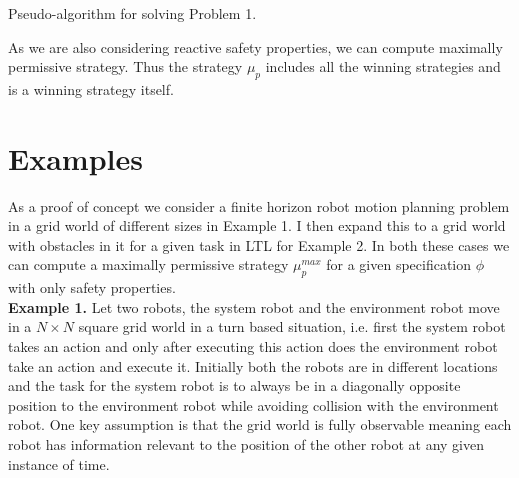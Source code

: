 \documentclass[letterpaper, 10 pt, conference]{ieeeconf}  %
\begin{document}
\begin{algorithm}
    \SetAlgoLined
    
\caption{Pseudo-algorithm for solving Problem 1.}

\end{algorithm}

As we are also considering reactive safety properties, we can compute maximally permissive strategy. Thus the strategy $\mu_p$ includes all the winning strategies and is a winning strategy itself.  

\section{Examples}

As a proof of concept we consider a finite horizon robot motion planning problem in a grid world of different sizes in Example 1. I then expand this to a grid world with obstacles in it for a given task in LTL for Example 2.  In both these cases we can compute a maximally permissive strategy $\mu_p^{max}$ for a given specification $\phi$ with only safety properties.\\

\textbf{Example 1.} Let two robots, the system robot and the environment robot move in a $N \times N$ square grid world in a turn based situation, i.e. first the system robot takes an action and only after executing this action does the environment robot take an action and execute it. Initially both the robots are in different locations and the task for the system robot is to always be in a diagonally opposite position to the environment robot while avoiding collision with the environment robot. One key assumption is that the grid world is fully observable meaning each robot has information relevant to the position of the other robot at any given instance of time.\\
\end{document}
